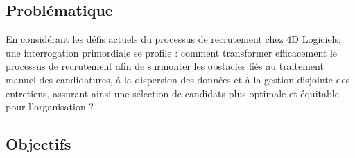 \subsection{Problématique}

En considérant les défis actuels du processus de recrutement chez
 4D Logiciels, une interrogation primordiale se profile : 
 comment transformer efficacement le processus de recrutement 
 afin de surmonter les obstacles liés au traitement manuel des 
 candidatures, à la dispersion des données et à la gestion 
 disjointe des entretiens, assurant ainsi une sélection de 
 candidats plus optimale et équitable pour l'organisation ?

\subsection{Objectifs}



